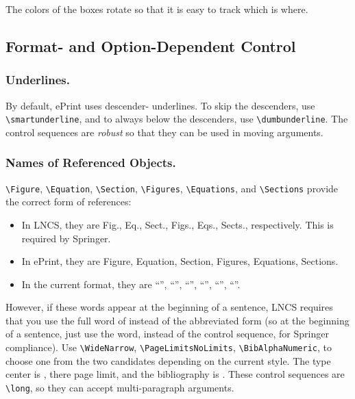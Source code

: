 The colors of the boxes rotate so that it is easy to track which is where.

\subsection{Format- and Option-Dependent Control }

\subsubsection{Underlines.}
By default, ePrint uses descender- underlines.
To  skip the descenders,
use \texttt{\textbackslash smartunderline}, and
to always  below the descenders,
use \texttt{\textbackslash dumbunderline}.
The control sequences are \emph{robust} so that
they can be used in moving arguments.

\subsubsection{Names of Referenced Objects.}
\texttt{\textbackslash Figure},
\texttt{\textbackslash Equation},
\texttt{\textbackslash Section},
\texttt{\textbackslash Figures},
\texttt{\textbackslash Equations}, and
\texttt{\textbackslash Sections}
provide the correct form of references:
\begin{itemize}
\item
In LNCS, they are Fig., Eq., Sect., Figs., Eqs., Sects., respectively.
This is required by Springer.
\item
In ePrint, they are Figure, Equation, Section, Figures, Equations, Sections.
\item
In the current format, they are
``\Figure'', ``\Equation'', ``\Section'',
``\Figures'', ``\Equations'', ``\Sections''.
\end{itemize}
However, if these words appear at the beginning of a sentence,
LNCS requires that you use the full word of instead of the abbreviated form
(so at the beginning of a sentence,
just use the word, instead of the control sequence,
for Springer compliance).
Use
\texttt{\textbackslash WideNarrow},
\texttt{\textbackslash PageLimitsNoLimits},
\texttt{\textbackslash BibAlphaNumeric},
to choose one from the two candidates depending on the current style.
The type center is ,
there  page limit,
and the bibliography is .
These control sequences are \texttt{\textbackslash long},
so they can accept multi-paragraph arguments.

